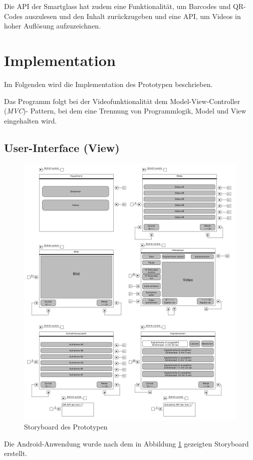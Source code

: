 Die API der Smartglass hat zudem eine Funktionalität, um Barcodes und QR-Codes auszulesen und den Inhalt zurückzugeben und eine API, um Videos in hoher Auflösung aufzuzeichnen. 
%
%
%
%
%
%
\section{Implementation}
\label{sec:Implementation}
Im Folgenden wird die Implementation des Prototypen beschrieben. 

Das Programm folgt bei der Videofunktionalität dem Model-View-Controller (\emph{MVC})- Pattern, bei dem eine Trennung von Programmlogik, Model und View eingehalten wird.
%
%
%
%
%
%
\subsection{User-Interface (View)}
\begin{figure}[htbp]
    \centering
    \includegraphics[width=1\textwidth]{data/bilder/UI-Storyboard.pdf}
    \caption{Storyboard des Prototypen}
    \label{fig:Storyboard_des_Prototypen}
\end{figure}
Die Android-Anwendung wurde nach dem in Abbildung \ref{fig:Storyboard_des_Prototypen} gezeigten Storyboard erstellt. 

